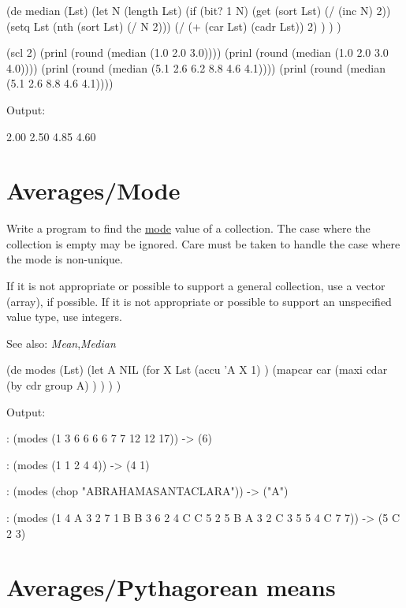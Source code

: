 \begin{wideverbatim}

(de median (Lst)
   (let N (length Lst)
      (if (bit? 1 N)
         (get (sort Lst) (/ (inc N) 2))
         (setq Lst (nth (sort Lst) (/ N 2)))
         (/ (+ (car Lst) (cadr Lst)) 2) ) ) )

(scl 2)
(prinl (round (median (1.0 2.0 3.0))))
(prinl (round (median (1.0 2.0 3.0 4.0))))
(prinl (round (median (5.1 2.6 6.2 8.8 4.6 4.1))))
(prinl (round (median (5.1 2.6 8.8 4.6 4.1))))

Output:

2.00
2.50
4.85
4.60

\end{wideverbatim}

\pagebreak{}
\section*{Averages/Mode}

Write a program to find the
\href{http://en.wikipedia.org/wiki/Mode\_(statistics)}{mode} value of
a collection. The case where the collection is empty may be ignored.
Care must be taken to handle the case where the mode is non-unique.

If it is not appropriate or possible to support a general collection,
use a vector (array), if possible. If it is not appropriate or possible
to support an unspecified value type, use integers.

See also: \emph{Mean},\emph{Median}

\begin{wideverbatim}

(de modes (Lst)
   (let A NIL
      (for X Lst
         (accu 'A X 1) )
      (mapcar car
         (maxi cdar
            (by cdr group A) ) ) ) )

Output:

: (modes (1 3 6 6 6 6 7 7 12 12 17))
-> (6)

: (modes (1 1 2 4 4))
-> (4 1)

: (modes (chop "ABRAHAMASANTACLARA"))
-> ("A")

: (modes (1 4 A 3 2 7 1 B B 3 6 2 4 C C 5 2 5 B A 3 2 C 3 5 5 4 C 7 7))
-> (5 C 2 3)

\end{wideverbatim}

\pagebreak{}
\section*{Averages/Pythagorean means}



